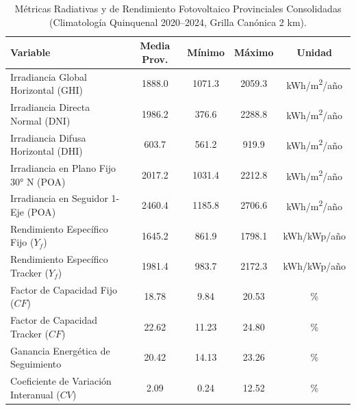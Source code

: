 \begin{table}[htbp]
\centering
\small
\caption{Métricas Radiativas y de Rendimiento Fotovoltaico Provinciales Consolidadas (Climatología Quinquenal 2020--2024, Grilla Canónica 2 km).}
\label{tab:metricas_consolidadas_5b}
\begin{tabular}{lcccc}
\toprule
\textbf{Variable} & \textbf{Media Prov.} & \textbf{Mínimo} & \textbf{Máximo} & \textbf{Unidad} \\
\midrule
Irradiancia Global Horizontal (GHI) & 1888.0 & 1071.3 & 2059.3 & kWh/m\textsuperscript{2}/año \\
Irradiancia Directa Normal (DNI) & 1986.2 & 376.6 & 2288.8 & kWh/m\textsuperscript{2}/año \\
Irradiancia Difusa Horizontal (DHI) & 603.7 & 561.2 & 919.9 & kWh/m\textsuperscript{2}/año \\
Irradiancia en Plano Fijo 30° N (POA) & 2017.2 & 1031.4 & 2212.8 & kWh/m\textsuperscript{2}/año \\
Irradiancia en Seguidor 1-Eje (POA) & 2460.4 & 1185.8 & 2706.6 & kWh/m\textsuperscript{2}/año \\
Rendimiento Específico Fijo ($Y_f$) & 1645.2 & 861.9 & 1798.1 & kWh/kWp/año \\
Rendimiento Específico Tracker ($Y_f$) & 1981.4 & 983.7 & 2172.3 & kWh/kWp/año \\
Factor de Capacidad Fijo ($CF$) & 18.78 & 9.84 & 20.53 & \% \\
Factor de Capacidad Tracker ($CF$) & 22.62 & 11.23 & 24.80 & \% \\
Ganancia Energética de Seguimiento & 20.42 & 14.13 & 23.26 & \% \\
Coeficiente de Variación Interanual ($CV$) & 2.09 & 0.24 & 12.52 & \% \\
\bottomrule
\end{tabular}
\end{table}
